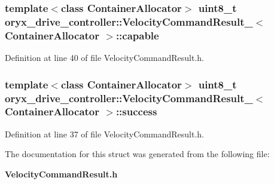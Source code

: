 \subsubsection[{capable}]{\setlength{\rightskip}{0pt plus 5cm}template$<$class \-Container\-Allocator$>$ uint8\-\_\-t {\bf oryx\-\_\-drive\-\_\-controller\-::\-Velocity\-Command\-Result\-\_\-}$<$ \-Container\-Allocator $>$\-::{\bf capable}}\label{structoryx__drive__controller_1_1VelocityCommandResult___a7eb554f15fb7fc3227b148983a0d9129}


\-Definition at line 40 of file \-Velocity\-Command\-Result.\-h.

\subsubsection[{success}]{\setlength{\rightskip}{0pt plus 5cm}template$<$class \-Container\-Allocator$>$ uint8\-\_\-t {\bf oryx\-\_\-drive\-\_\-controller\-::\-Velocity\-Command\-Result\-\_\-}$<$ \-Container\-Allocator $>$\-::{\bf success}}\label{structoryx__drive__controller_1_1VelocityCommandResult___a547fa7ce249c954587771c99e47ad9a2}


\-Definition at line 37 of file \-Velocity\-Command\-Result.\-h.



\-The documentation for this struct was generated from the following file\-:\begin{DoxyCompactItemize}
\item 
{\bf \-Velocity\-Command\-Result.\-h}\end{DoxyCompactItemize}
